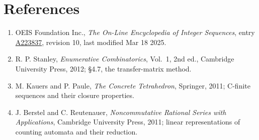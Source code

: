 \documentclass[11pt]{article}
\theoremstyle{definition}
\begin{document}
\section{References}

\begin{enumerate}

\item OEIS Foundation Inc., \emph{The On-Line Encyclopedia of Integer Sequences}, entry \href{https://oeis.org/A223837}{A223837}, revision 10, last modified Mar 18 2025.

\item R. P. Stanley, \emph{Enumerative Combinatorics}, Vol.~1, 2nd ed., Cambridge University Press, 2012; \S4.7, the transfer-matrix method.

\item M. Kauers and P. Paule, \emph{The Concrete Tetrahedron}, Springer, 2011; C-finite sequences and their closure properties.

\item J. Berstel and C. Reutenauer, \emph{Noncommutative Rational Series with Applications}, Cambridge University Press, 2011; linear representations of counting automata and their reduction.

\end{enumerate}
\end{document}

